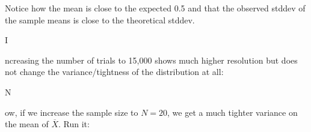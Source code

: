\documentclass[titlepage]{tufte-book}
\newcounter{problem}
\newcommand{\step}[1]{{}
\vspace{4pt} \noindent {\bf \theproblem. }#1\addtocounter{problem}{1}}
\begin{document}
\begin{fullwidth}
\noindent Notice how the mean is close to the expected 0.5 and that the observed stddev of the sample means is close to the theoretical stddev.

\step Increasing the number of trials to 15,000 shows much higher resolution but does not change the variance/tightness of the distribution at all:


\step Now, if we increase the sample size to $N=20$, we get a much tighter variance on the mean of $\overline{X}$. Run it:



\end{fullwidth}
\end{document}
